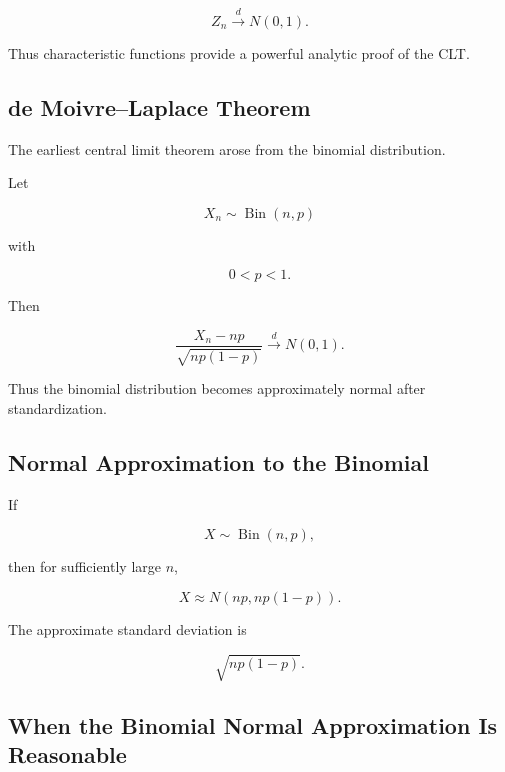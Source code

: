 \[
\boxed{
Z_n
\xrightarrow{d}
N(0,1).
}
\]

Thus characteristic functions provide a powerful analytic proof of the
CLT.

\subsection{de Moivre--Laplace Theorem}
\label{subsec:de-moivre-laplace}

The earliest central limit theorem arose from the binomial
distribution.

\begin{theorem}
Let

\[
X_n
\sim
\operatorname{Bin}(n,p)
\]

with

\[
0<p<1.
\]

Then

\[
\boxed{
\frac{
X_n-np
}{
\sqrt{np(1-p)}
}
\xrightarrow{d}
N(0,1).
}
\]
\end{theorem}

Thus the binomial distribution becomes approximately normal after
standardization.

\subsection{Normal Approximation to the Binomial}
\label{subsec:normal-approx-binomial}

If

\[
X\sim\operatorname{Bin}(n,p),
\]

then for sufficiently large \(n\),

\[
\boxed{
X
\approx
N
\left(
np,
np(1-p)
\right).
}
\]

The approximate standard deviation is

\[
\boxed{
\sqrt{
np(1-p)
}.
}
\]

\subsection{When the Binomial Normal Approximation Is Reasonable}
\label{subsec:binomial-normal-conditions}

